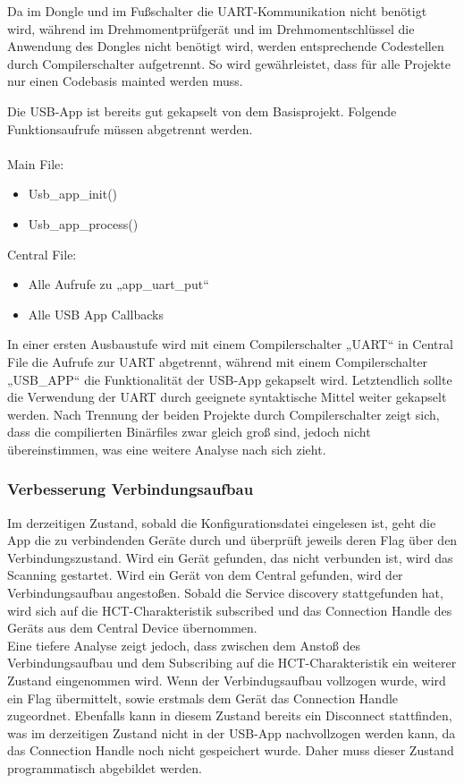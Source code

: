 Da im Dongle und im Fußschalter die UART-Kommunikation nicht benötigt wird, während im Drehmomentprüfgerät und im Drehmomentschlüssel die Anwendung des Dongles nicht benötigt wird, werden entsprechende Codestellen durch Compilerschalter aufgetrennt. So wird gewährleistet, dass für alle Projekte nur einen Codebasis mainted werden muss. 

Die USB-App ist bereits gut gekapselt von dem Basisprojekt. Folgende Funktionsaufrufe müssen abgetrennt werden.\\
\\
Main File:
\begin{itemize}
	\item Usb\_app\_init() 
	\item Usb\_app\_process() 
\end{itemize}
Central File:
\begin{itemize}
	\item Alle Aufrufe zu „app\_uart\_put“ 
	\item Alle USB App Callbacks 
\end{itemize}

In einer ersten Ausbaustufe wird mit einem Compilerschalter „UART“ in Central File die Aufrufe zur UART abgetrennt, während mit einem Compilerschalter „USB\_APP“ die Funktionalität der USB-App gekapselt wird. Letztendlich sollte die Verwendung der UART durch geeignete syntaktische Mittel weiter gekapselt werden. 
Nach Trennung der beiden Projekte durch Compilerschalter zeigt sich, dass die compilierten Binärfiles zwar gleich groß sind, jedoch nicht übereinstimmen, was eine weitere Analyse nach sich zieht.

\subsubsection{Verbesserung Verbindungsaufbau}
Im derzeitigen Zustand, sobald die Konfigurationsdatei eingelesen ist, geht die App die zu verbindenden Geräte durch und überprüft jeweils deren Flag über den Verbindungszustand. Wird ein Gerät gefunden, das nicht verbunden ist, wird das Scanning gestartet. Wird ein Gerät von dem Central gefunden, wird der Verbindungsaufbau angestoßen. Sobald die Service discovery stattgefunden hat, wird sich auf die HCT-Charakteristik subscribed und das Connection Handle des Geräts aus dem Central Device übernommen. \\

Eine tiefere Analyse zeigt jedoch, dass zwischen dem Anstoß des Verbindungsaufbau und dem Subscribing auf die HCT-Charakteristik ein weiterer Zustand eingenommen wird. Wenn der Verbindugsaufbau vollzogen wurde, wird ein Flag übermittelt, sowie erstmals dem Gerät das Connection Handle zugeordnet. Ebenfalls kann in diesem Zustand bereits ein Disconnect stattfinden, was im derzeitigen Zustand nicht in der USB-App nachvollzogen werden kann, da das Connection Handle noch nicht gespeichert wurde. Daher muss dieser Zustand programmatisch abgebildet werden.

